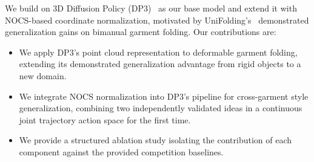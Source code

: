 We build on 3D Diffusion Policy (DP3)~\cite{ze2024dp3} as our base model and extend it with NOCS-based coordinate normalization, motivated by UniFolding's~\cite{unifolding2023} demonstrated generalization gains on bimanual garment folding. Our contributions are:

\begin{itemize}[leftmargin=*,noitemsep]
    \item We apply DP3's point cloud representation to deformable garment folding, extending its demonstrated generalization advantage from rigid objects to a new domain.
    \item We integrate NOCS normalization into DP3's pipeline for cross-garment style generalization, combining two independently validated ideas in a continuous joint trajectory action space for the first time.
    \item We provide a structured ablation study isolating the contribution of each component against the provided competition baselines.
\end{itemize}
